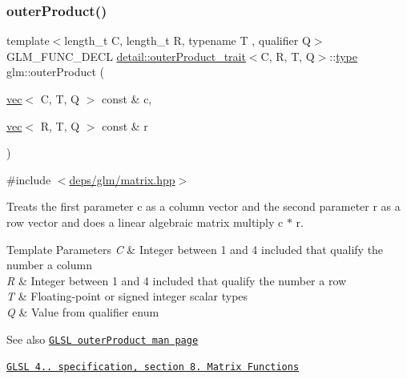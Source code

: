 \subsubsection{\texorpdfstring{outer\+Product()}{outerProduct()}}
{\footnotesize\ttfamily template$<$length\+\_\+t C, length\+\_\+t R, typename T , qualifier Q$>$ \\
G\+L\+M\+\_\+\+F\+U\+N\+C\+\_\+\+D\+E\+CL \hyperlink{structglm_1_1detail_1_1outerProduct__trait}{detail\+::outer\+Product\+\_\+trait}$<$C, R, T, Q$>$\+::\hyperlink{structglm_1_1type}{type} glm\+::outer\+Product (\begin{DoxyParamCaption}\item[{\hyperlink{structglm_1_1vec}{vec}$<$ C, T, Q $>$ const \&}]{c,  }\item[{\hyperlink{structglm_1_1vec}{vec}$<$ R, T, Q $>$ const \&}]{r }\end{DoxyParamCaption})}



{\ttfamily \#include $<$\hyperlink{matrix_8hpp}{deps/glm/matrix.\+hpp}$>$}

Treats the first parameter c as a column vector and the second parameter r as a row vector and does a linear algebraic matrix multiply c $\ast$ r.


\begin{DoxyTemplParams}{Template Parameters}
{\em C} & Integer between 1 and 4 included that qualify the number a column \\
\hline
{\em R} & Integer between 1 and 4 included that qualify the number a row \\
\hline
{\em T} & Floating-\/point or signed integer scalar types \\
\hline
{\em Q} & Value from qualifier enum\\
\hline
\end{DoxyTemplParams}
\begin{DoxySeeAlso}{See also}
\href{http://www.opengl.org/sdk/docs/manglsl/xhtml/outerProduct.xml}{\tt G\+L\+SL outer\+Product man page} 

\href{http://www.opengl.org/registry/doc/GLSLangSpec.4.20.8.pdf}{\tt G\+L\+SL 4.. specification, section 8. Matrix Functions} 
\end{DoxySeeAlso}
\mbox{\label{group__core__func__matrix_gae679d841da8ce9dbcc6c2d454f15bc35}} 
